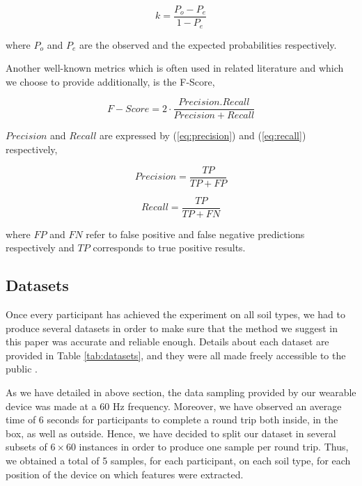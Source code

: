 \documentclass[conference]{IEEEtran}
\begin{document}
\begin{equation}
	\label{eq:kappa}
	k = \frac{P_o-P_e}{1-P_e}
\end{equation}

\noindent where $P_o$ and $P_e$ are the observed and the expected probabilities respectively. 

Another well-known metrics which is often used in related literature and which we choose to provide additionally,  is the F-Score,

\begin{equation}
	\label{eq:f_score}
	F-Score = 2\cdot\frac{Precision . Recall}{Precision + Recall}
\end{equation}

\noindent $Precision$ and $Recall$ are expressed by (\ref{eq:precision}) and (\ref{eq:recall}) respectively,

\begin{equation}
	\label{eq:precision}
	Precision = \frac{TP}{TP + FP}
\end{equation}

\begin{equation}
	\label{eq:recall}
	Recall = \frac{TP}{TP + FN}
\end{equation}

\noindent where $FP$ and $FN$ refer to false positive and false negative predictions respectively and $TP$ corresponds to true positive results.

\subsection{Datasets}

Once every participant has achieved the experiment on all soil types, we had to produce several datasets in order to make sure that the method we suggest in this paper was accurate and reliable enough. Details about each dataset are provided in Table \ref{tab:datasets}, and they were all made freely accessible to the public \cite{Thullier2017}. 

As we have detailed in above section, the data sampling provided by our wearable device was made at a 60 Hz frequency. Moreover, we have observed an average time of 6 seconds for participants to complete a round trip both inside, in the box, as well as outside. Hence, we have decided to split our dataset in several subsets of $6 \times 60$ instances in order to produce one sample per round trip. Thus, we obtained a total of 5 samples, for each participant, on each soil type, for each position of the device on which features were extracted.
\end{document}
